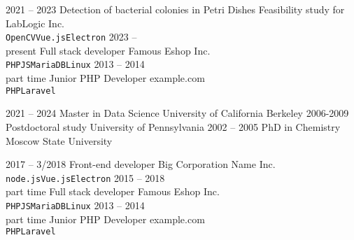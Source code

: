 \documentclass[9pt]{developercv} %
\begin{document}
\begin{entrylist}
	\entry
	{2021 -- 2023}
	{Detection of bacterial colonies in Petri Dishes}
	{Feasibility study for LabLogic Inc.}
	{\lorem \lorem \lorem\\ \texttt{OpenCV}\slashsep\texttt{Vue.js}\slashsep\texttt{Electron}}
	\entry
	{2023 -- \\\footnotesize{present}}
	{Full stack developer}
	{Famous Eshop Inc.}
	{\lorem\lorem\\ \texttt{PHP}\slashsep\texttt{JS}\slashsep\texttt{MariaDB}\slashsep\texttt{Linux}}
	\entry
	{2013 -- 2014\\\footnotesize{part time}}
	{Junior PHP Developer}
	{example.com}
	{\lorem\lorem\\ \texttt{PHP}\slashsep\texttt{Laravel}}
\end{entrylist}



\begin{entrylist}
	\entry
	{2021 -- 2024}
	{Master in Data Science}
	{University of California Berkeley}
	{\lorem\lorem\lorem}
	\entry
	{2006-2009}
	{Postdoctoral study}
	{University of Pennsylvania}
	{\lorem\lorem}
	\entry
	{2002 -- 2005}
	{PhD in Chemistry}
	{Moscow State University}
	{\lorem\lorem}
\end{entrylist}



\begin{entrylist}
	\entry
		{2017 -- 3/2018}
		{Front-end developer}
		{Big Corporation Name Inc.}
		{\lorem \lorem \lorem\\ \texttt{node.js}\slashsep\texttt{Vue.js}\slashsep\texttt{Electron}}
	\entry
		{2015 -- 2018\\\footnotesize{part time}}
		{Full stack developer}
		{Famous Eshop Inc.}
		{\lorem\lorem\\ \texttt{PHP}\slashsep\texttt{JS}\slashsep\texttt{MariaDB}\slashsep\texttt{Linux}}
	\entry
		{2013 -- 2014\\\footnotesize{part time}}
		{Junior PHP Developer}
		{example.com}
		{\lorem\lorem\\ \texttt{PHP}\slashsep\texttt{Laravel}}
\end{entrylist}
\end{document}
